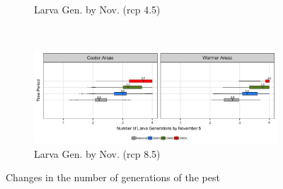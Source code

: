 \documentclass[12pt]{article}
\theoremstyle{plain}
\theoremstyle{definition}
\theoremstyle{definition}
\begin{document}
\begin{figure}[h!]
\begin{subfigure}[b]{0.45\textwidth}
        \caption{\small Larva Gen. by Nov. (rcp 4.5)}
        \label{fig:Larva_Gen_Nov_rcp45}
    \end{subfigure}
    ~ %
    \begin{subfigure}[b]{0.45\textwidth}
        \includegraphics[width=\textwidth]{figures/Larva_Gen_Nov_rcp85}
        \caption{\small  Larva Gen. by Nov. (rcp 8.5)}
        \label{fig:Larva_Gen_Nov_rcp85}
    \end{subfigure}
    \caption{Changes in the number of generations of the pest}\label{fig:CNGP}
\end{figure}

\pagebreak
\end{document}
